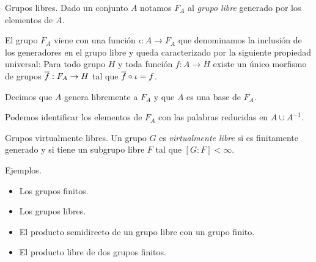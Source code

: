 \documentclass[aspectratio=169, 11pt]{beamer}
\begin{document}
	\begin{frame}[fragile]{Grupos libres.}
		Dado un conjunto $A$ notamos $F_{A}$ al \emph{grupo libre} generado por los elementos de $A$. 

		El grupo $F_{A}$ viene con una función $\iota: A \to F_{A}$ que denominamos la inclusión de los generadores en el grupo libre y queda caracterizado por la siguiente propiedad universal: 
		Para todo grupo $H$ y toda función $f:A \to H$ existe un único morfismo de grupos $\overline f: F_{A} \to H$ tal que $\overline f \circ \iota = f$.
		\begin{center}
		\end{center}

		Decimos que $A$ genera libremente a $F_{A}$ y que $A$ es una base de $F_{A}$.

		Podemos identificar los elementos de $F_{A}$ con las palabras reducidas en $A \cup A^{-1}$.
	\end{frame}

	\begin{frame}[fragile]{Grupos virtualmente libres.}
		Un grupo $G$ es \emph{virtualmente libre} si es finitamente generado y si
		tiene un subgrupo libre $F$ tal que $[G:F] < \infty$.

		\begin{alertblock}{Ejemplos.}
			\begin{itemize}
				\item Los grupos finitos.
				\item Los grupos libres.
				\item El producto semidirecto de un grupo libre con un grupo finito.
				\item El producto libre de dos grupos finitos.
			\end{itemize}
		\end{alertblock}
	\end{frame}
\end{document}
